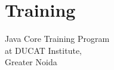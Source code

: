 \documentclass[]{hieudo-build}
\begin{document}
\begin{minipage}[t]{0.3\textwidth}
\sectionsep



\section{Training}
Java Core Training Program\\
at DUCAT Institute, \\
Greater Noida \\
\sectionsep



\sectionsep

%
%
\end{minipage} 
\hfill
\end{document}
